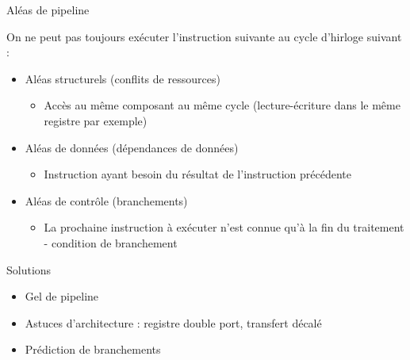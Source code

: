 %
\begin{Frame}{Aléas de pipeline}

\begin{block}{On ne peut pas toujours exécuter l'instruction suivante au cycle d'hirloge suivant :}
       \begin{center}
 	\begin{itemize}
         \item Aléas structurels (conflits de ressources)
		\begin {itemize}
         		\item Accès au même composant au même cycle (lecture-écriture dans le même registre par exemple)
		\end{itemize}
	 \item Aléas de données (dépendances de données)
		\begin {itemize}
         		\item Instruction ayant besoin du résultat de l'instruction précédente
		\end{itemize}
	 \item Aléas de contrôle (branchements)
		\begin {itemize}
         		\item La prochaine instruction à exécuter n'est connue qu'à la fin du traitement - condition de branchement
		\end{itemize}
        \end{itemize}
       \end{center}
      \end{block}   

 

\begin{block}{Solutions}
       \begin{center}
 	\begin{itemize}
         \item Gel de pipeline
	 \item Astuces d'architecture : registre double port, transfert décalé
	 \item Prédiction de branchements
        \end{itemize}
       \end{center}
      \end{block}   

\end{Frame}


